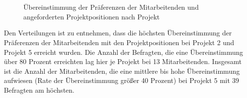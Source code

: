 \begin{figure}[H]
    \\
    \\
\caption[Übereinstimmung der Präferenzen der Mitarbeitenden und angeforderten Projektpositionen nach Projekt]{Übereinstimmung der Präferenzen der Mitarbeitenden und angeforderten Projektpositionen nach Projekt}
  \label{fig:ergebnisse:abb4}
\end{figure}
Den Verteilungen ist zu entnehmen, dass die höchsten Übereinstimmung der Präferenzen der Mitarbeitenden mit den Projektpositionen bei Projekt 2 und Projekt 5 erreicht wurden.
Die Anzahl der Befragten, die eine Übereinstimmung über 80 Prozent erreichten lag hier je Projekt bei 13 Mitarbeitenden.
Insgesamt ist die Anzahl der Mitarbeitenden, die eine mittlere bis hohe Übereinstimmung aufwiesen (Rate der Übereinstimmung größer 40 Prozent) bei Projekt 5 mit 39 Befragten am höchsten.

